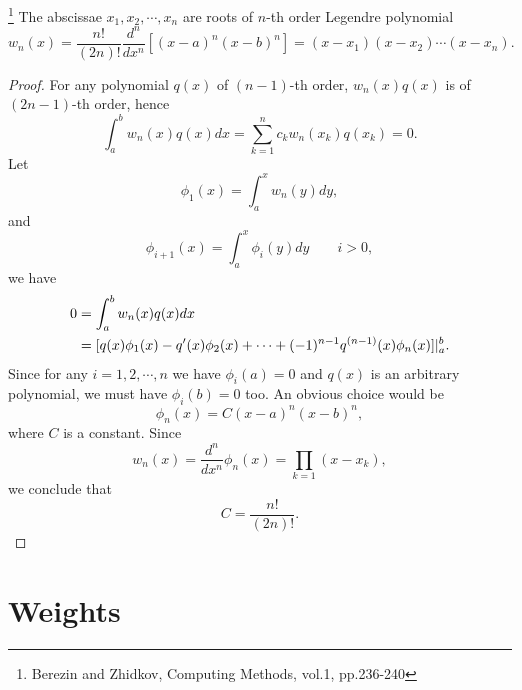 \begin{lemma}
\footnote{Berezin and Zhidkov, Computing Methods, vol.1, pp.236-240}
The abscissae $x_1,x_2,\cdots,x_n$ are roots of $n$-th order Legendre polynomial
\begin{equation} \label{E:abs}
  w_n(x) = \frac{n!}{(2n)!} \frac{d^n}{dx^n} 
    \left[ (x-a)^n (x-b)^n \right]
    = (x-x_1) (x-x_2) \cdots (x-x_n).
\end{equation}
\end{lemma}
\begin{proof}
For any polynomial $q(x)$ of $(n-1)$-th order, $w_n(x) q(x)$ is of $(2n-1)$-th
order, hence
\begin{equation} \label{E:zeroint}
  \int_a^b w_n(x) q(x) dx = \sum_{k=1}^n c_k w_n(x_k) q(x_k) = 0.
\end{equation}
Let 
\begin{equation}
  \phi_1(x) = \int_a^x w_n(y) dy,
\end{equation}
and
\begin{equation}
  \phi_{i+1}(x) = \int_a^x \phi_i(y) dy  \qquad i>0,
\end{equation}
we have
\begin{align*}
  0 &= \int_a^b w_n(x) q(x) dx   \notag \\
    &= [q(x)\phi_1(x) - q'(x)\phi_2(x)+\cdots 
        + (-1)^{n-1}q^{(n-1)}(x)\phi_n(x)]|_a^b. \notag \\
\end{align*}
Since for any $i=1,2,\cdots,n$ we have $\phi_i(a)=0$ and $q(x)$ is an 
arbitrary polynomial, we must have $\phi_i(b)=0$ too. An obvious choice would be
\[
  \phi_n(x) = C (x-a)^n (x-b)^n,
\]
where $C$ is a constant. Since
\[
  w_n(x) = \frac{d^n}{dx^n} \phi_n(x) = \prod_{k=1} (x-x_k),
\]
we conclude that 
\[
  C = \frac{n!}{(2n)!}.
\]
\end{proof}


\section{Weights}

